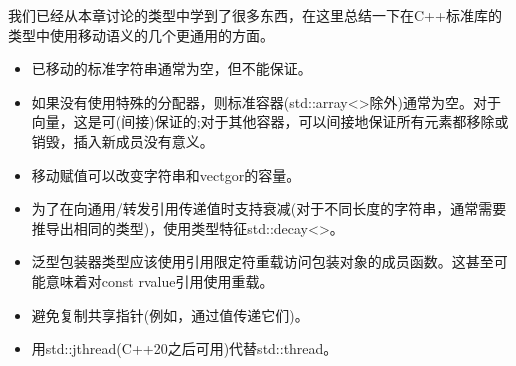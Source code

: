 我们已经从本章讨论的类型中学到了很多东西，在这里总结一下在C++标准库的类型中使用移动语义的几个更通用的方面。\par

\begin{itemize}
	\item 已移动的标准字符串通常为空，但不能保证。
	\item 如果没有使用特殊的分配器，则标准容器(std::array<>除外)通常为空。对于向量，这是可(间接)保证的;对于其他容器，可以间接地保证所有元素都移除或销毁，插入新成员没有意义。
	\item 移动赋值可以改变字符串和vectgor的容量。
	\item 为了在向通用/转发引用传递值时支持衰减(对于不同长度的字符串，通常需要推导出相同的类型)，使用类型特征std::decay<>。
	\item 泛型包装器类型应该使用引用限定符重载访问包装对象的成员函数。这甚至可能意味着对const rvalue引用使用重载。
	\item 避免复制共享指针(例如，通过值传递它们)。
	\item 用std::jthread(C++20之后可用)代替std::thread。
\end{itemize}


\newpage